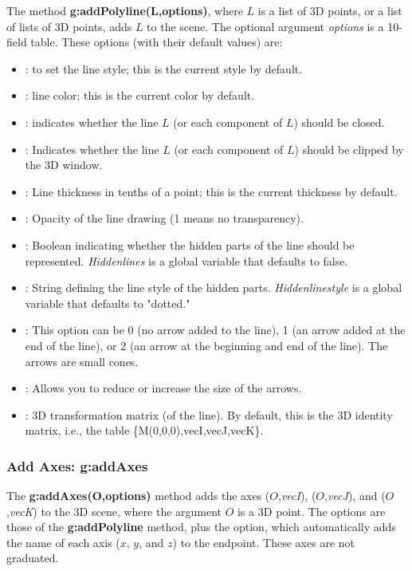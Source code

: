 The method \textbf{g:addPolyline(L,options)}, where $L$ is a list of 3D points, or a list of lists of 3D points, adds $L$ to the scene. The optional argument \emph{options} is a 10-field table. These options (with their default values) are:
\begin{itemize}
    \item {}: to set the line style; this is the current style by default.
    \item {}: line color; this is the current color by default.
    \item {}: indicates whether the line $L$ (or each component of $L$) should be closed.     \item {}: Indicates whether the line $L$ (or each component of $L$) should be clipped by the 3D window.
    \item {}: Line thickness in tenths of a point; this is the current thickness by default.
    \item {}: Opacity of the line drawing (1 means no transparency).
    \item {}: Boolean indicating whether the hidden parts of the line should be represented. \emph{Hiddenlines} is a global variable that defaults to false.
    \item {}: String defining the line style of the hidden parts. \emph{Hiddenlinestyle} is a global variable that defaults to "dotted."     \item {}: This option can be 0 (no arrow added to the line), 1 (an arrow added at the end of the line), or 2 (an arrow at the beginning and end of the line). The arrows are small cones.
    \item {}: Allows you to reduce or increase the size of the arrows.
    \item {}: 3D transformation matrix (of the line). By default, this is the 3D identity matrix, i.e., the table \{M(0,0,0),vecI,vecJ,vecK\}.
\end{itemize}

\subsubsection{Add Axes: g:addAxes}

The \textbf{g:addAxes(O,options)} method adds the axes ($O$,\emph{vecI}), ($O$,\emph{vecJ}), and ($O$,\emph{vecK}) to the 3D scene, where the argument $O$ is a 3D point. The options are those of the \textbf{g:addPolyline} method, plus the  option, which automatically adds the name of each axis ($x$, $y$, and $z$) to the endpoint. These axes are not graduated.

